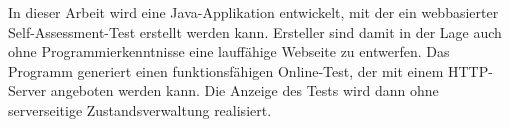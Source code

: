 \label{Abstract}
In dieser Arbeit wird eine Java-Applikation entwickelt, mit der ein webbasierter Self-Assessment-Test erstellt werden kann. 
Ersteller sind damit in der Lage auch ohne Programmierkenntnisse eine lauffähige Webseite zu entwerfen.
Das Programm generiert einen funktionsfähigen Online-Test, der mit einem HTTP-Server angeboten werden kann. Die Anzeige des Tests wird dann ohne serverseitige Zustandsverwaltung realisiert.
